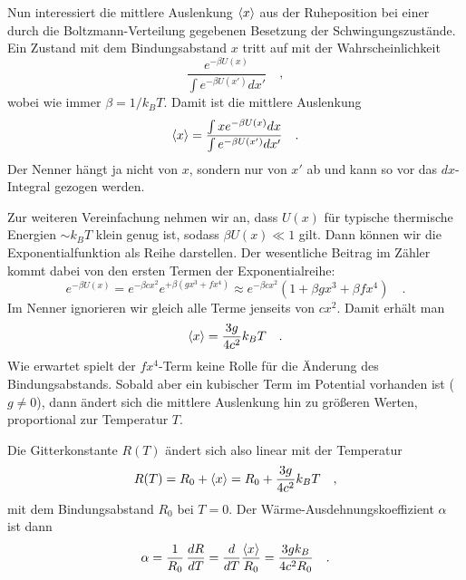 Nun interessiert die mittlere Auslenkung $\braket{x}$ aus der Ruheposition bei einer durch die Boltzmann-Verteilung gegebenen Besetzung der Schwingungszustände. Ein Zustand mit dem Bindungsabstand $x$ tritt auf mit der Wahrscheinlichkeit
\begin{equation}
    \frac{e^{- \beta U(x)}}{\int  e^{- \beta U(x')} dx'} \quad ,
\end{equation}
wobei wie immer $\beta = 1 / k_B T$.
Damit ist die mittlere Auslenkung
\begin{equation}
  \braket{x} =   \frac{\int x e^{- \beta U(x)} dx}{\int e^{- \beta U(x')} dx'} \quad .
\end{equation}
Der Nenner hängt ja nicht von $x$, sondern nur von $x'$ ab und kann so vor das $dx$-Integral gezogen werden. 

Zur weiteren Vereinfachung nehmen wir an, dass $U(x)$ für typische thermische Energien $\sim k_B T$ klein genug ist, sodass $\beta U(x) \ll 1$ gilt. Dann können wir die Exponentialfunktion als Reihe darstellen. Der wesentliche Beitrag im Zähler kommt dabei von den ersten Termen der Exponentialreihe:
\begin{equation}
    e^{- \beta U(x)} = e^{- \beta c x^2} e^{+ \beta (g x^3 + f x^4)} \approx e^{- \beta c x^2}  \left( 1+ \beta g x^3 + \beta f x^4 \right)
    \quad .
\end{equation}
Im Nenner ignorieren wir gleich alle Terme jenseits von $c x^2$. Damit erhält man 
\begin{equation}
    \braket{x} = \frac{3 g}{4 c^2} k_B T \quad .
\end{equation}
Wie erwartet spielt der $f x^4$-Term keine Rolle für die Änderung des Bindungsabstands.
Sobald aber ein kubischer Term im Potential vorhanden ist ($g \neq 0$), dann ändert sich die mittlere Auslenkung hin zu größeren Werten, proportional zur Temperatur $T$. 

Die Gitterkonstante $R(T)$ ändert sich also linear mit der Temperatur
\begin{equation}
    R(T) = R_0 + \braket{x}  = R_0 + \frac{3 g}{4 c^2} k_B T \quad ,
\end{equation}
mit dem  Bindungsabstand $R_0$ bei $T=0$.
Der Wärme-Ausdehnungskoeffizient $\alpha$ ist dann
\begin{equation}
    \alpha = \frac{1}{R_0} \, \frac{dR}{dT}=    
    \frac{d}{dT} \frac{ \braket{x}}{R_0} = \frac{3 g k_B}{4 c^2 R_0}  \quad .
\end{equation}

